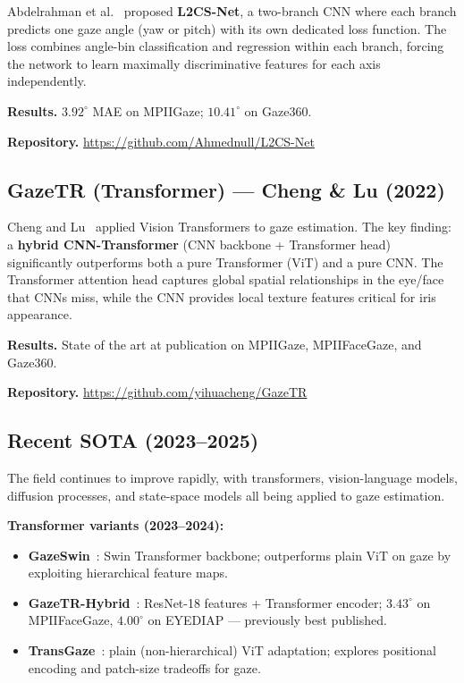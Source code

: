 \documentclass[11pt,a4paper]{article}
\begin{document}
Abdelrahman et al.~\cite{abdelrahman2022l2cs} proposed \textbf{L2CS-Net}, a two-branch CNN where each branch predicts one gaze angle (yaw or pitch) with its own dedicated loss function.
The loss combines angle-bin classification and regression within each branch, forcing the network to learn maximally discriminative features for each axis independently.

\textbf{Results.} $3.92^\circ$ MAE on MPIIGaze; $10.41^\circ$ on Gaze360.

\textbf{Repository.} \url{https://github.com/Ahmednull/L2CS-Net}

\subsection{GazeTR (Transformer) --- Cheng \& Lu (2022)}

Cheng and Lu~\cite{cheng2022gazetr} applied Vision Transformers to gaze estimation.
The key finding: a \textbf{hybrid CNN-Transformer} (CNN backbone + Transformer head) significantly outperforms both a pure Transformer (ViT) and a pure CNN.
The Transformer attention head captures global spatial relationships in the eye/face that CNNs miss, while the CNN provides local texture features critical for iris appearance.

\textbf{Results.} State of the art at publication on MPIIGaze, MPIIFaceGaze, and Gaze360.

\textbf{Repository.} \url{https://github.com/yihuacheng/GazeTR}

\subsection{Recent SOTA (2023--2025)}

The field continues to improve rapidly, with transformers, vision-language models,
diffusion processes, and state-space models all being applied to gaze estimation.

\textbf{Transformer variants (2023--2024):}
\begin{itemize}
  \item \textbf{GazeSwin}~\cite{gazeswin2024}: Swin Transformer backbone; outperforms
        plain ViT on gaze by exploiting hierarchical feature maps.
  \item \textbf{GazeTR-Hybrid}~\cite{cheng2022gazetr}: ResNet-18 features + Transformer encoder;
        $3.43^\circ$ on MPIIFaceGaze, $4.00^\circ$ on EYEDIAP --- previously best published.
  \item \textbf{TransGaze}~\cite{transgaze2024}: plain (non-hierarchical) ViT adaptation;
        explores positional encoding and patch-size tradeoffs for gaze.
\end{itemize}
\end{document}
